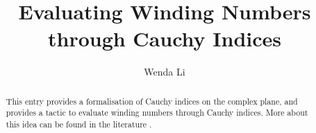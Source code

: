 \documentclass[11pt,a4paper]{article}
\begin{document}
\title{Evaluating Winding Numbers through Cauchy Indices}
\author{Wenda Li}
\maketitle

\begin{abstract}
  This entry provides a formalisation of Cauchy indices on the complex plane, and provides a tactic to evaluate winding numbers through Cauchy indices. More about this idea can be found in the literature \cite{eisermann2012fundamental,rahman2002analytic}.
\end{abstract}






\end{document}
